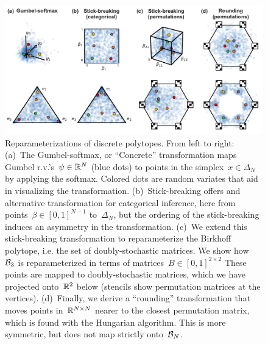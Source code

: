 \documentclass[twoside]{article}
\begin{document}
\begin{figure}[ht!]
  \centering
  \includegraphics[width=6.5in]{../figures/figure1.pdf} 
  \caption{Reparameterizations of discrete polytopes.  From left to
    right: (a)~The Gumbel-softmax, or ``Concrete'' transformation maps
    Gumbel r.v.'s~${\psi \in \mathbb{R}^N}$ (blue dots) to points in the
    simplex~${x \in \Delta_{N}}$ by applying the softmax.  Colored
    dots are random variates that aid in visualizing the
    transformation.  (b)~Stick-breaking offers and alternative
    transformation for categorical inference, here from
    points~$\beta \in [0,1]^{N-1}$ to~$\Delta_N$, but the ordering of
    the stick-breaking induces an asymmetry in the transformation.
    (c)~We extend this stick-breaking transformation to reparameterize
    the Birkhoff polytope, i.e. the set of doubly-stochastic
    matrices. We show how~$\mathcal{B}_3$ is reparameterized in terms of
    matrices~$B \in [0,1]^{2 \times 2}$ These points are mapped to
    doubly-stochastic matrices, which we have projected
    onto~$\mathbb{R}^2$ below (stencils show permutation matrices at the
    vertices).  (d)~Finally, we derive a ``rounding'' transformation
    that moves points in~$\mathbb{R}^{N \times N}$ nearer to the closest
    permutation matrix, which is found with the Hungarian algorithm.
    This is more symmetric, but does not map strictly onto~$\mathcal{B}_N$.
  }
\label{fig:transforms}
\end{figure}
\end{document}
